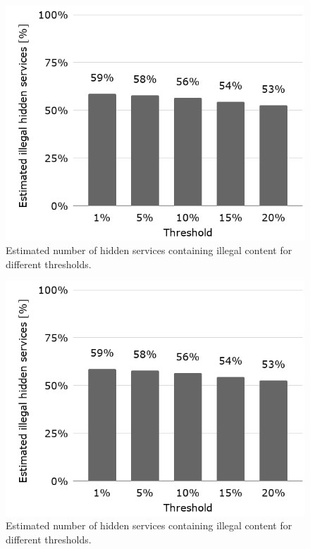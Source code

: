 \ifdgruyter
  \begin{figure}[H]
    \centering
    \includegraphics[width=0.8 \linewidth]{images/legalHostsByThreshold.png}
    \caption{Estimated number of hidden services containing illegal content for different thresholds.}
    \label{fig:legalityByThreshold}
  \end{figure}
\fi

\iflncs
  \begin{figure}[H]
    \centering
    \includegraphics[width=0.55\linewidth]{images/legalHostsByThreshold.png}
    \caption{Estimated number of hidden services containing illegal content for different thresholds.}
    \label{fig:legalityByThreshold}
  \end{figure}
\fi

